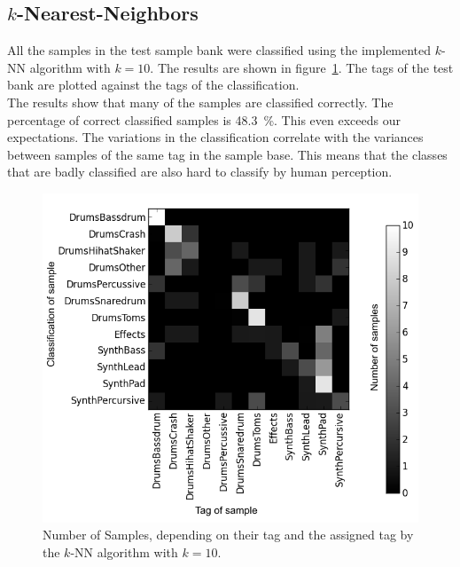 \subsection{$k$-Nearest-Neighbors}
All the samples in the test sample bank were classified using the implemented $k$-NN algorithm with $k=10$. The results are shown in figure~\ref{fig:k-NN}. The tags of the test bank are plotted against the tags of the classification.\\
The results show that many of the samples are classified correctly. The percentage of correct classified samples is 48.3~\%. This even exceeds our expectations. The variations in the classification correlate with the variances between samples of the same tag in the sample base. This means that the classes that are badly classified are also hard to classify by human perception.

\begin{figure}[htbp]
\centering
\includegraphics[width=0.47\linewidth]{../measurements/knn_mod.png}
\caption{Number of Samples, depending on their tag and the assigned tag by the $k$-NN algorithm with $k=10$.}
\label{fig:k-NN}
\end{figure}
